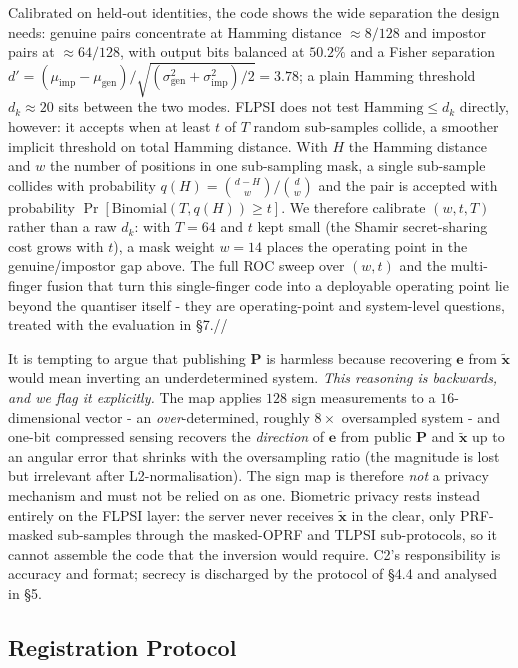 \documentclass[11pt,a4paper]{article}
\begin{document}
Calibrated on held-out identities, the code shows the wide separation the design
needs: genuine pairs concentrate at Hamming distance $\approx 8/128$ and impostor
pairs at $\approx 64/128$, with output bits balanced at $50.2\%$ and a Fisher
separation
$d'=(\mu_{\mathrm{imp}}-\mu_{\mathrm{gen}})/\sqrt{(\sigma_{\mathrm{gen}}^2+\sigma_{\mathrm{imp}}^2)/2}=3.78$;
a plain Hamming threshold $d_k\approx 20$ sits between the
two modes. FLPSI does not test $\mathrm{Hamming}\le d_k$ directly, however: it accepts
when at least $t$ of $T$ random sub-samples collide, a smoother implicit threshold on
total Hamming distance. With $H$ the Hamming distance and $w$ the number of positions
in one sub-sampling mask, a single sub-sample collides with probability
$q(H)=\binom{d-H}{w}\big/\binom{d}{w}$ and the pair is accepted with probability
$\Pr[\mathrm{Binomial}(T,q(H))\ge t]$. We therefore calibrate $(w,t,T)$ rather than a
raw $d_k$: with $T=64$ and $t$ kept small (the Shamir secret-sharing cost grows with
$t$), a mask weight $w=14$ places the operating point in the genuine/impostor gap
above. The full ROC sweep over $(w,t)$ and the multi-finger fusion that turn this
single-finger code into a deployable operating point lie beyond the quantiser itself
- they are operating-point and system-level questions, treated with the evaluation
in \S7.//


It is tempting to argue that publishing $\mathbf{P}$ is harmless because recovering
$\mathbf{e}$ from $\tilde{\mathbf{x}}$ would mean inverting an underdetermined system.
\emph{This reasoning is backwards, and we flag it explicitly.} The map applies $128$
sign measurements to a $16$-dimensional vector - an \emph{over}-determined, roughly
$8\times$ oversampled system - and one-bit compressed sensing recovers the
\emph{direction} of $\mathbf{e}$ from public $\mathbf{P}$ and $\tilde{\mathbf{x}}$ up
to an angular error that shrinks with the oversampling ratio (the magnitude is lost
but irrelevant after L2-normalisation). The sign map is therefore \emph{not} a privacy
mechanism and must not be relied on as one. Biometric privacy rests instead entirely
on the FLPSI layer: the server never receives $\tilde{\mathbf{x}}$ in the clear, only
PRF-masked sub-samples through the masked-OPRF and TLPSI sub-protocols, so it cannot
assemble the code that the inversion would require. C2's responsibility is accuracy
and format; secrecy is discharged by the protocol of \S4.4 and analysed in \S5.

\subsection{Registration Protocol}
\end{document}
